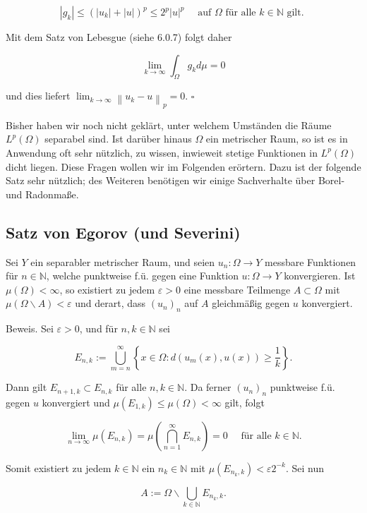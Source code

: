 \documentclass[10pt, letterpaper]{article}
\begin{document}
$$
\left|g_{k}\right| \leq\left(\left|u_{k}\right|+|u|\right)^{p} \leq 2^{p}|u|^{p} \quad \text { auf } \Omega \text { für alle } k \in \mathbb{N} \text { gilt. }
$$

Mit dem Satz von Lebesgue (siehe 6.0.7) folgt daher

$$
\lim _{k \rightarrow \infty} \int_{\Omega} g_{k} d \mu=0
$$

und dies liefert $\lim _{k \rightarrow \infty}\left\|u_{k}-u\right\|_{p}=0$. \(\square\)

Bisher haben wir noch nicht geklärt, unter welchem Umständen die Räume $L^{p}(\Omega)$ separabel sind. Ist darüber hinaus $\Omega$ ein metrischer Raum, so ist es in Anwendung oft sehr nützlich, zu wissen, inwieweit stetige Funktionen in $L^{p}(\Omega)$ dicht liegen. Diese Fragen wollen wir im Folgenden erörtern. Dazu ist der folgende Satz sehr nützlich; des Weiteren benötigen wir einige Sachverhalte über Borel- und Radonmaße.

\subsection*{Satz von Egorov (und Severini)}
Sei $Y$ ein separabler metrischer Raum, und seien $u_{n}: \Omega \rightarrow Y$ messbare Funktionen für $n \in \mathbb{N}$, welche punktweise f.ü. gegen eine Funktion $u: \Omega \rightarrow Y$ konvergieren. Ist $\mu(\Omega)<\infty$, so existiert zu jedem $\varepsilon>0$ eine messbare Teilmenge $A \subset \Omega$ mit $\mu(\Omega \backslash A)<\varepsilon$ und derart, dass $\left(u_{n}\right)_{n}$ auf $A$ gleichmäßig gegen $u$ konvergiert.

Beweis. Sei $\varepsilon>0$, und für $n, k \in \mathbb{N}$ sei

$$
E_{n, k}:=\bigcup_{m=n}^{\infty}\left\{x \in \Omega: d\left(u_{m}(x), u(x)\right) \geq \frac{1}{k}\right\} .
$$

Dann gilt $E_{n+1, k} \subset E_{n, k}$ für alle $n, k \in \mathbb{N}$. Da ferner $\left(u_{n}\right)_{n}$ punktweise f.ü. gegen $u$ konvergiert und $\mu\left(E_{1, k}\right) \leq \mu(\Omega)<\infty$ gilt, folgt

$$
\lim _{n \rightarrow \infty} \mu\left(E_{n, k}\right)=\mu\left(\bigcap_{n=1}^{\infty} E_{n, k}\right)=0 \quad \text { für alle } k \in \mathbb{N} .
$$

Somit existiert zu jedem $k \in \mathbb{N}$ ein $n_{k} \in \mathbb{N}$ mit $\mu\left(E_{n_{k}, k}\right)<\varepsilon 2^{-k}$. Sei nun

$$
A:=\Omega \backslash \bigcup_{k \in \mathbb{N}} E_{n_{k}, k} .
$$
\end{document}
